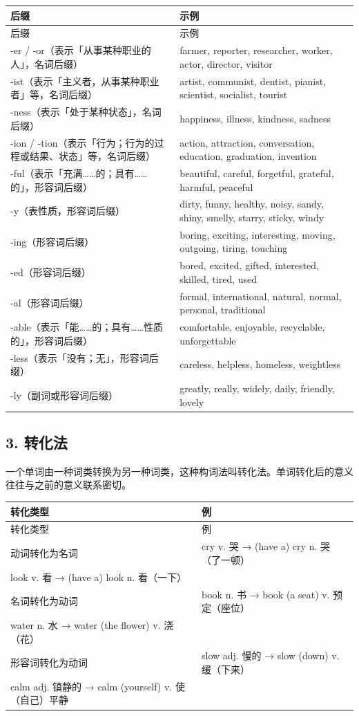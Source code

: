 \documentclass[11pt,a4paper]{ctexart}
\begin{document}
{\footnotesize
\begin{longtable}{p{6.70cm}p{6.70cm}}
\hline
后缀 & 示例 \\
\hline
\endfirsthead
\hline
后缀 & 示例 \\
\hline
\endhead
\hline
\endfoot
-er / -or（表示「从事某种职业的人」，名词后缀） & farmer, reporter, researcher, worker, actor, director, visitor \\
-ist（表示「主义者，从事某种职业者」等，名词后缀） & artist, communist, dentist, pianist, scientist, socialist, tourist \\
-ness（表示「处于某种状态」，名词后缀） & happiness, illness, kindness, sadness \\
-ion / -tion（表示「行为；行为的过程或结果、状态」等，名词后缀） & action, attraction, conversation, education, graduation, invention \\
-ful（表示「充满……的；具有……的」，形容词后缀） & beautiful, careful, forgetful, grateful, harmful, peaceful \\
-y（表性质，形容词后缀） & dirty, funny, healthy, noisy, sandy, shiny, smelly, starry, sticky, windy \\
-ing（形容词后缀） & boring, exciting, interesting, moving, outgoing, tiring, touching \\
-ed（形容词后缀） & bored, excited, gifted, interested, skilled, tired, used \\
-al（形容词后缀） & formal, international, natural, normal, personal, traditional \\
-able（表示「能……的；具有……性质的」，形容词后缀） & comfortable, enjoyable, recyclable, unforgettable \\
-less（表示「没有；无」，形容词后缀） & careless, helpless, homeless, weightless \\
-ly（副词或形容词后缀） & greatly, really, widely, daily, friendly, lovely \\
\end{longtable}
}

\subsection*{3. 转化法}

一个单词由一种词类转换为另一种词类，这种构词法叫转化法。单词转化后的意义往往与之前的意义联系密切。

{\footnotesize
\begin{longtable}{p{6.70cm}p{6.70cm}}
\hline
转化类型 & 例 \\
\hline
\endfirsthead
\hline
转化类型 & 例 \\
\hline
\endhead
\hline
\endfoot
动词转化为名词 & cry v. 哭 → (have a) cry n. 哭（了一顿）\\ look v. 看 → (have a) look n. 看（一下） \\
名词转化为动词 & book n. 书 → book (a seat) v. 预定（座位）\\ water n. 水 → water (the flower) v. 浇（花） \\
形容词转化为动词 & slow adj. 慢的 → slow (down) v. 缓（下来）\\ calm adj. 镇静的 → calm (yourself) v. 使（自己）平静 \\
\end{longtable}
}
\end{document}
